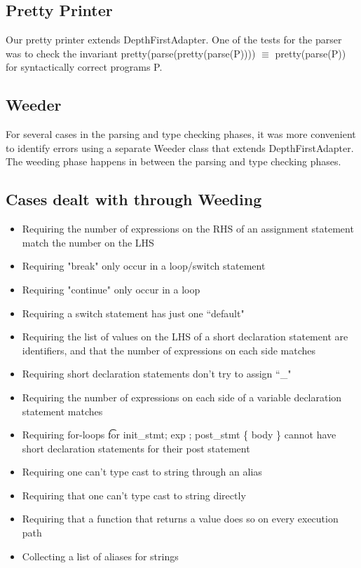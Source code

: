 \documentclass[11pt]{article}
\begin{document}
\subsection{Pretty Printer}
Our pretty printer extends DepthFirstAdapter. One of the tests for the parser was to check the invariant pretty(parse(pretty(parse(P)))) $\equiv$ pretty(parse(P)) for syntactically correct programs P.


\subsection{Weeder}
For several cases in the parsing and type checking phases, it was more convenient to identify errors using a separate Weeder class that extends DepthFirstAdapter. The weeding phase happens in between the parsing and type checking phases.

\subsection*{Cases dealt with through Weeding}
\begin{itemize}
\item Requiring the number of expressions on the RHS of an assignment statement match the number on the LHS
\item Requiring "break" only occur in a loop/switch statement
\item Requiring "continue" only occur in a loop
\item Requiring a switch statement has just one ``default"
\item Requiring the list of values on the LHS of a short declaration statement are identifiers, and that the number of expressions on each side matches
\item Requiring short declaration statements don't try to assign ``\_"
\item Requiring the number of expressions on each side of a variable declaration statement matches
\item Requiring for-loops \t{for init\_stmt; exp ; post\_stmt \{ body \}} cannot have short declaration statements for their post statement
\item Requiring one can't type cast to string through an alias
\item Requiring that one can't type cast to string directly
\item Requiring that a function that returns a value does so on every execution path
\item Collecting a list of aliases for strings
\end{itemize}
\end{document}
